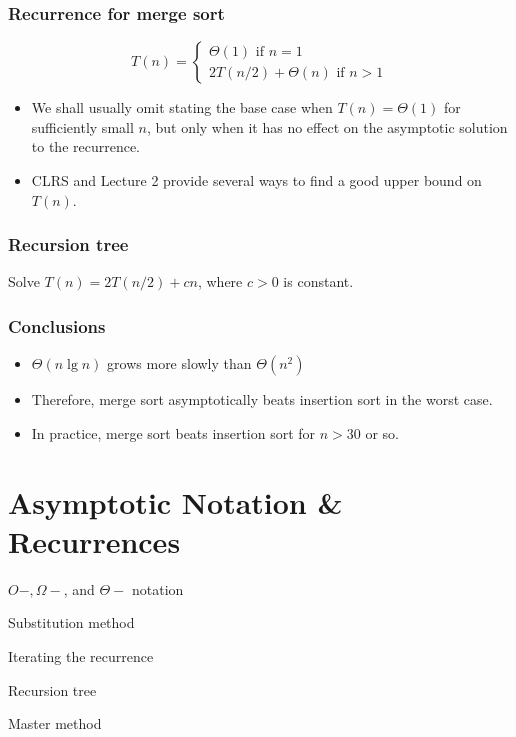 \documentclass[11pt,toc=twocol]{elegantbook}
\begin{document}
\subsection{Recurrence for merge sort}
$$
T(n)=\left\{\begin{array}{l}
\Theta(1) \text { if } n=1 \\
2 T(n / 2)+\Theta(n) \text { if } n>1
\end{array}\right.
$$
\begin{note}
  \begin{itemize}
    \item We shall usually omit stating the base case when $T(n)=\Theta(1)$ for sufficiently small $n$, but only when it has no effect on the asymptotic solution to the recurrence. 
    \item CLRS and Lecture 2 provide several ways to find a good upper bound on $T(n)$.
  \end{itemize}
\end{note}
\subsection{Recursion tree}
\begin{example}
  Solve $T(n)=2 T(n / 2)+c n$, where $c>0$ is constant.
\end{example}
\subsection{Conclusions}
\begin{itemize}
  \item $\Theta(n \lg n)$ grows more slowly than $\Theta\left(n^{2}\right)$
  \item Therefore, merge sort asymptotically beats insertion sort in the worst case.
  \item In practice, merge sort beats insertion sort for $n > 30$ or so.            
\end{itemize}

\chapter{Asymptotic Notation \& Recurrences}
\begin{introduction}
  \item $O-, \Omega-$, and $\Theta-$ notation
  \item Substitution method
  \item Iterating the recurrence
  \item Recursion tree
  \item Master method
\end{introduction}
\end{document}
